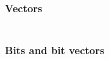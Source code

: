 \subsubsection{Vectors}\hypertarget{vectors}{}\label{vectors}

\begin{align*}
  [ \
  \KEY{Datatype} \quad & \NAMEHYPER{../Values/Composite}{Vectors}{vectors} \\
  \KEY{Funcon} \quad & \NAMEHYPER{../Values/Composite}{Vectors}{vector} \\
  \KEY{Funcon} \quad & \NAMEHYPER{../Values/Composite}{Vectors}{vector-elements}
  \ ]
\end{align*}
\subsubsection{Bits and bit vectors}\hypertarget{bits-and-bit-vectors}{}\label{bits-and-bit-vectors}

